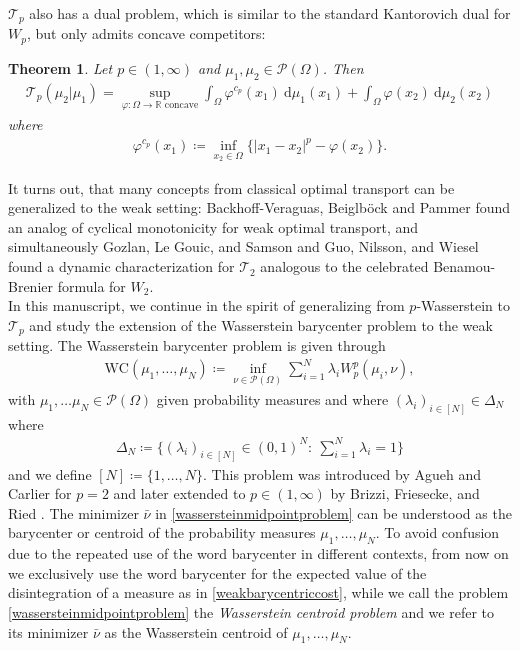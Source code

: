 \documentclass[10pt,a4paper]{amsart}
\newcommand{\RR}{\mathbb{R}}
\newcommand{\dd}{\mathrm{d}}
\newtheorem{thm}{Theorem}[section]
\begin{document}
$\mathcal T_p$ also has a dual problem, which is similar to the standard Kantorovich dual for $W_p$, but only admits concave competitors:
\begin{thm}\cite[Thm 2.11(3)]{gozlan2017}\label{weakdualitythm} Let $p\in(1,\infty)$ and $\mu_1,\mu_2\in\mathcal P(\Omega)$. Then
	\begin{gather*}
		\mathcal T_p(\mu_2|\mu_1)=\sup_{\varphi:\Omega\rightarrow\RR\text{ concave}}\int_{\Omega} \varphi^{c_p}(x_1)\ \dd\mu_1(x_1)+\int_{\Omega}\varphi(x_2)\ \dd\mu_2(x_2)
	\end{gather*}
	where
	\begin{gather*}
		\varphi^{c_p}(x_1)\coloneqq \inf_{x_2\in\Omega}\Big\{ |x_1-x_2|^p-\varphi(x_2)\Big\}.
	\end{gather*}
\end{thm}
It turns out, that many concepts from classical optimal transport can be generalized to the weak setting: Backhoff-Veraguas, Beiglb{\"o}ck and Pammer \cite{backhoff2019} found an analog of cyclical monotonicity for weak optimal transport, and simultaneously Gozlan, Le Gouic, and Samson \cite{gozlan2025} and Guo, Nilsson, and Wiesel \cite{guo2026} found a dynamic characterization for $\mathcal T_2$ analogous to the celebrated Benamou-Brenier formula \cite{benamou2000} for $W_2$.\\
In this manuscript, we continue in the spirit of generalizing from $p$-Wasserstein to $\mathcal T_p$ and study the extension of the Wasserstein barycenter problem to the weak setting. 
The Wasserstein barycenter problem is given through
\begin{gather}\label{wassersteinmidpointproblem}
	\text{WC}(\mu_1,\dots,\mu_N)\coloneqq\inf_{\nu\in\mathcal P(\Omega)}\sum_{i=1}^N\lambda_i W_p^p(\mu_i,\nu),
\end{gather}
with $\mu_1,\dots\mu_N\in\mathcal P(\Omega)$ given probability measures and where $(\lambda_i)_{i\in[N]}\in\Delta_N$ where 
\begin{gather}\label{deltaN}
	\Delta_N\coloneqq\Big\{(\lambda_i)_{i\in[N]}\in(0,1)^N:\ \sum_{i=1}^N\lambda_i=1\Big\}
\end{gather}
and we define $[N]\coloneqq\{1,\dots,N\}$.
 This problem was introduced by Agueh and Carlier \cite{agueh2011} for $p=2$ and later extended to $p\in (1,\infty)$ by Brizzi, Friesecke, and Ried \cite{brizzi2025}. The minimizer $\bar\nu$ in \eqref{wassersteinmidpointproblem} can be understood as the barycenter or centroid of the probability measures $\mu_1,\dots,\mu_N$. To avoid confusion due to the repeated use of the word barycenter in different contexts, from now on we exclusively use the word barycenter for the expected value of the disintegration of a measure as in \eqref{weakbarycentriccost}, while we call the problem \eqref{wassersteinmidpointproblem} the \textit{Wasserstein centroid problem} and we refer to its minimizer $\bar\nu$ as the Wasserstein centroid of $\mu_1,\dots,\mu_N$.\\
\end{document}
